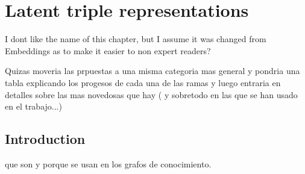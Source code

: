 \chapter{Latent triple representations}\label{chap:embeddings}


I dont like the name of this chapter, but I assume it was changed from Embeddings as to make it easier to non expert readers?


Quizas moveria las prpuestas a una misma categoria mas general y pondria una tabla explicando los progesos de cada una de las ramas y luego entraria en detalles sobre las mas novedosas que hay ( y sobretodo en las que se han usado en el trabajo...)

\section{Introduction}\label{sec:emb-intro}
que son y porque se usan en los grafos de conocimiento.


